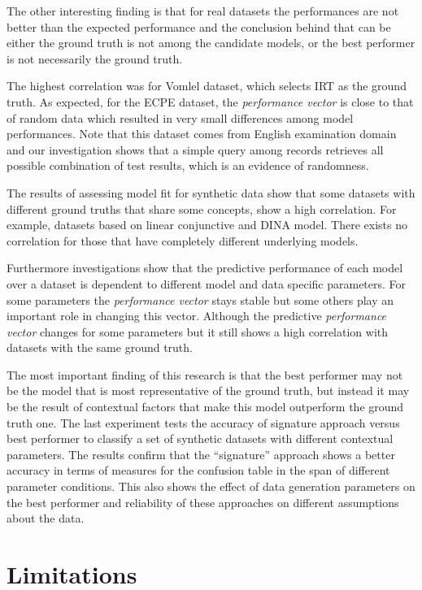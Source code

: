The other interesting finding is that for real datasets the performances are not better than the expected performance and the conclusion behind that can be either the ground truth is not among the candidate models, or the best performer is not necessarily the ground truth. 



The highest correlation was for Vomlel dataset, which selects IRT as the ground truth. As expected, for the ECPE dataset, the \textit{performance vector} is close to that of random data which resulted in very small differences among model performances. Note that this dataset comes from English examination domain and our investigation shows that a simple query among records retrieves all possible combination of test results, which is an evidence of randomness.

The results of assessing model fit for synthetic data show that some datasets with different ground truths that share some concepts, show a high correlation. For example, datasets based on linear conjunctive and DINA model. There exists no correlation for those that have completely different underlying models.

Furthermore investigations show that the predictive performance of each model over a dataset is dependent to different model and data specific parameters. For some parameters the \textit{performance vector} stays stable but some others play an important role in changing this vector. Although the predictive \textit{performance vector} changes for some parameters but it still shows a high correlation with datasets with the same ground truth.


The most important finding of this research is that the best performer may not be the model that is most representative of the ground truth, but instead it may be the result of contextual factors that make this model outperform the ground truth one. The last experiment tests the accuracy of signature approach versus best performer to classify a set of synthetic datasets with different contextual parameters. The results confirm that the ``signature'' approach shows a better accuracy in terms of measures for the confusion table in the span of different parameter conditions. This also shows the effect of data generation parameters on the best performer and reliability of these approaches on different assumptions about the data.

\section{Limitations}

